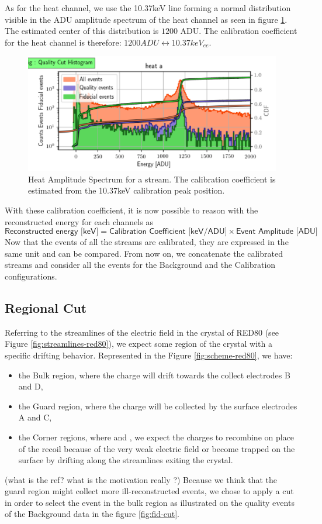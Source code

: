 As for the heat channel, we use the 10.37keV line forming a normal distribution visible in the ADU amplitude spectrum of the heat channel as seen in figure \ref{fig:calibration-heat}. The estimated center of this distribution is $1200$ ADU. The calibration coefficient for the heat channel is therefore: $1200 ADU \leftrightarrow 10.37 keV_{ee}$.

\begin{figure}
\centering
\includegraphics[width=\linewidth,]{Figures/Neutron/calibration_heat.png}
\caption{Heat Amplitude Spectrum for a stream. The calibration coefficient is estimated from the 10.37keV calibration peak position.}
\label{fig:calibration-heat}
\end{figure}

With these calibration coefficient, it is now possible to reason with the reconstructed energy for each channels as
$$
\textsf{Reconstructed energy [keV]}
=
\textsf{Calibration Coefficient [keV/ADU]}
\times
\textsf{Event Amplitude [ADU]}
$$
Now that the events of all the streams are calibrated, they are expressed in the same unit and can be compared. From now on, we concatenate the calibrated streams and consider all the events for the Background and the Calibration configurations.

\subsection{Regional Cut}

Referring to the streamlines of the electric field in the crystal of RED80 (see Figure \ref{fig:streamlines-red80}), we expect some region of the crystal with a specific drifting behavior. Represented in the Figure \ref{fig:scheme-red80}, we have:
\begin{itemize}
	\item the Bulk region, where the charge will drift towards the collect electrodes B and D,
	\item the Guard region, where the charge will be collected by the surface electrodes A and C,
	\item the Corner regions, where and , we expect the charges to recombine on place of the recoil because of the very weak electric field or become trapped on the surface by drifting along the streamlines exiting the crystal.
\end{itemize}
{\color{red}(what is the ref? what is the motivation really ?)}
Because we think that the guard region might collect more ill-reconstructed events, we chose to apply a cut in order to select the event in the bulk region as illustrated on the quality events of the Background data in the figure \ref{fig:fid-cut}.

